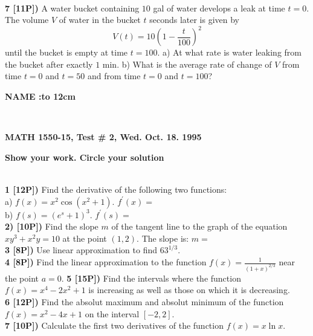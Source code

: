 \documentclass[12pt]{article}
\begin{document}
\\ %
{\bf 7 [11P])} A water bucket containing $10$ gal of water
develops a leak at time
$t=0$. The volume $V$ of water
in the bucket $t$ seconds later is given by
\[ V(t) = 10\left(1 - \frac{t}{100}\right)^2\]
until the bucket is empty at time $t=100$.
a) At what rate is water leaking from the bucket after
exactly $1$ min.
b) What is the average rate of change of $V$ from time $t=0$
and $t=50$ and from time $t=0$ and $t=100$?
\centerline{\large\bf NAME :\hbox to 12cm{\hrulefill}}
\\ %
\centerline{\bf MATH 1550-15, Test \# 2, Wed. Oct. 18. 1995}
\centerline{\bf Show your work. Circle your solution}
\\ %
{\bf 1 [12P])} Find the derivative of the following two functions:
\\ %
a) ${\displaystyle f(x) = x^2\cos (x^2 + 1)}$.
${\displaystyle f^\prime (x) =  }$
\\ %
b) ${\displaystyle f(s) = (e^s + 1)^3 }$. ${\displaystyle f^\prime(s) = }$
\\ %
{\bf 2) [10P])} Find the slope $m$ of the tangent line to the graph
of the equation 
$\displaystyle{xy^3+x^2y=10}$
at the point $(1,2)$.
The slope is: $m = $
\\ %
{\bf 3 [8P])} Use linear approximation to find $63^{1/3}$.
\\ %
{\bf 4 [8P])} Find the linear approximation to the function
${\displaystyle f(x) = \frac{1}{(1 + x)^{2/3}}}$
near the point $a = 0$.
{\bf 5 [15P])} Find the intervals where the function
${\displaystyle f(x) = x^4 - 2x^2 +1}$ is increasing as well as
those on which it is decreasing.
\\ %
{\bf 6 [12P])} Find the absolut maximum and absolut minimum of
the function ${\displaystyle f(x) = x^2 - 4x + 1}$ on the
interval $[-2,2]$.
\\ %
{\bf 7 [10P])} Calculate the first two derivatives of the function
$f(x) = x \ln x$.
\end{document}
